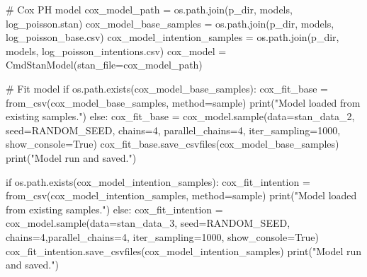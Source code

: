 \documentclass[
  letterpaper,
  DIV=11,
  numbers=noendperiod]{scrartcl}
\newenvironment{Shaded}{\begin{snugshade}}{\end{snugshade}}
\newcommand{\BuiltInTok}[1]{\textcolor[rgb]{0.00,0.23,0.31}{#1}}
\newcommand{\CommentTok}[1]{\textcolor[rgb]{0.37,0.37,0.37}{#1}}
\newcommand{\ControlFlowTok}[1]{\textcolor[rgb]{0.00,0.23,0.31}{#1}}
\newcommand{\DecValTok}[1]{\textcolor[rgb]{0.68,0.00,0.00}{#1}}
\newcommand{\NormalTok}[1]{\textcolor[rgb]{0.00,0.23,0.31}{#1}}
\newcommand{\OperatorTok}[1]{\textcolor[rgb]{0.37,0.37,0.37}{#1}}
\newcommand{\StringTok}[1]{\textcolor[rgb]{0.13,0.47,0.30}{#1}}
\newcommand{\VariableTok}[1]{\textcolor[rgb]{0.07,0.07,0.07}{#1}}
\begin{document}
\begin{Shaded}
\begin{Highlighting}[]
\CommentTok{\# Cox PH model}
\NormalTok{cox\_model\_path }\OperatorTok{=}\NormalTok{ os.path.join(p\_dir, }\StringTok{\textquotesingle{}models\textquotesingle{}}\NormalTok{, }\StringTok{\textquotesingle{}log\_poisson.stan\textquotesingle{}}\NormalTok{)}
\NormalTok{cox\_model\_base\_samples }\OperatorTok{=}\NormalTok{ os.path.join(p\_dir, }\StringTok{\textquotesingle{}models\textquotesingle{}}\NormalTok{, }\StringTok{\textquotesingle{}log\_poisson\_base.csv\textquotesingle{}}\NormalTok{)}
\NormalTok{cox\_model\_intention\_samples }\OperatorTok{=}\NormalTok{ os.path.join(p\_dir, }\StringTok{\textquotesingle{}models\textquotesingle{}}\NormalTok{, }\StringTok{\textquotesingle{}log\_poisson\_intentions.csv\textquotesingle{}}\NormalTok{)}
\NormalTok{cox\_model }\OperatorTok{=}\NormalTok{ CmdStanModel(stan\_file}\OperatorTok{=}\NormalTok{cox\_model\_path)}
\end{Highlighting}
\end{Shaded}

\begin{Shaded}
\begin{Highlighting}[]
\CommentTok{\# Fit model}
\ControlFlowTok{if}\NormalTok{ os.path.exists(cox\_model\_base\_samples):}
\NormalTok{    cox\_fit\_base }\OperatorTok{=}\NormalTok{ from\_csv(cox\_model\_base\_samples, method}\OperatorTok{=}\StringTok{\textquotesingle{}sample\textquotesingle{}}\NormalTok{)}
    \BuiltInTok{print}\NormalTok{(}\StringTok{"Model loaded from existing samples."}\NormalTok{)}
\ControlFlowTok{else}\NormalTok{:}
\NormalTok{    cox\_fit\_base }\OperatorTok{=}\NormalTok{ cox\_model.sample(data}\OperatorTok{=}\NormalTok{stan\_data\_2, seed}\OperatorTok{=}\NormalTok{RANDOM\_SEED, chains}\OperatorTok{=}\DecValTok{4}\NormalTok{, parallel\_chains}\OperatorTok{=}\DecValTok{4}\NormalTok{, iter\_sampling}\OperatorTok{=}\DecValTok{1000}\NormalTok{, show\_console}\OperatorTok{=}\VariableTok{True}\NormalTok{)}
\NormalTok{    cox\_fit\_base.save\_csvfiles(cox\_model\_base\_samples)}
    \BuiltInTok{print}\NormalTok{(}\StringTok{"Model run and saved."}\NormalTok{)}

\ControlFlowTok{if}\NormalTok{ os.path.exists(cox\_model\_intention\_samples):}
\NormalTok{    cox\_fit\_intention }\OperatorTok{=}\NormalTok{ from\_csv(cox\_model\_intention\_samples, method}\OperatorTok{=}\StringTok{\textquotesingle{}sample\textquotesingle{}}\NormalTok{)}
    \BuiltInTok{print}\NormalTok{(}\StringTok{"Model loaded from existing samples."}\NormalTok{)}
\ControlFlowTok{else}\NormalTok{:}
\NormalTok{    cox\_fit\_intention }\OperatorTok{=}\NormalTok{ cox\_model.sample(data}\OperatorTok{=}\NormalTok{stan\_data\_3, seed}\OperatorTok{=}\NormalTok{RANDOM\_SEED, chains}\OperatorTok{=}\DecValTok{4}\NormalTok{,parallel\_chains}\OperatorTok{=}\DecValTok{4}\NormalTok{, iter\_sampling}\OperatorTok{=}\DecValTok{1000}\NormalTok{, show\_console}\OperatorTok{=}\VariableTok{True}\NormalTok{)}
\NormalTok{    cox\_fit\_intention.save\_csvfiles(cox\_model\_intention\_samples)}
    \BuiltInTok{print}\NormalTok{(}\StringTok{"Model run and saved."}\NormalTok{)}
\end{Highlighting}
\end{Shaded}
\end{document}

